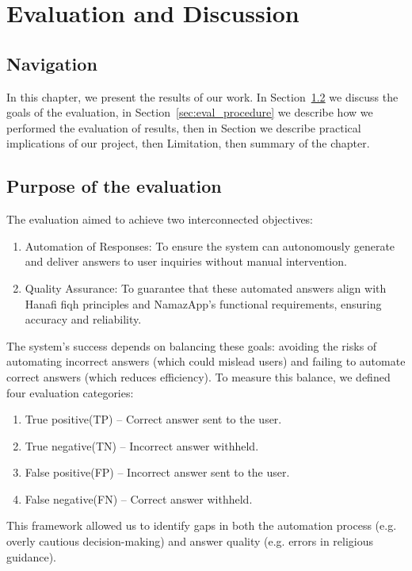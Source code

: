 \chapter{Evaluation and Discussion}
\label{chap:eval}

\section{Navigation}

In this chapter, we present the results of our work. In Section~\ref{sec:purpose_of_evaluation} we discuss the goals of the evaluation, in Section~\ref{sec:eval_procedure} we describe how we performed the evaluation of results, then in Section we describe practical implications of our project, then Limitation, then summary of the chapter.



\section{Purpose of the evaluation}
\label{sec:purpose_of_evaluation}
The evaluation aimed to achieve two interconnected objectives:
    \begin{enumerate}
        \item Automation of Responses: To ensure the system can autonomously generate and deliver answers to user inquiries without manual intervention.
        
        \item Quality Assurance: To guarantee that these automated answers align with Hanafi fiqh principles and NamazApp’s functional requirements, ensuring accuracy and reliability.
    \end{enumerate}
The system’s success depends on balancing these goals: avoiding the risks of automating incorrect answers (which could mislead users) and failing to automate correct answers (which reduces efficiency). To measure this balance, we defined four evaluation categories:

    \begin{enumerate}
        \item True positive(TP) -- Correct answer sent to the user.
        \item True negative(TN) -- Incorrect answer withheld.
        \item False positive(FP) -- Incorrect answer sent to the user.
        \item False negative(FN) -- Correct answer withheld.
    \end{enumerate}
This framework allowed us to identify gaps in both the automation process (e.g. overly cautious decision-making) and answer quality (e.g. errors in religious guidance).
